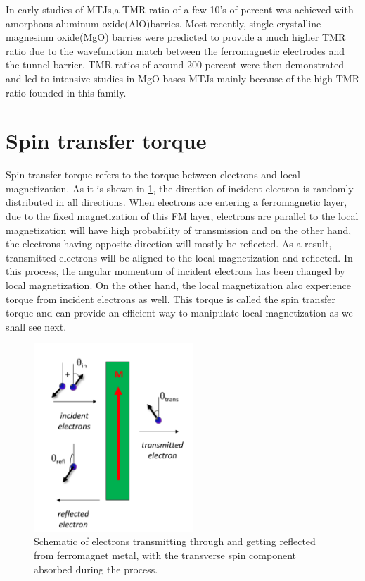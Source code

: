 In early studies of MTJs,a TMR ratio of a few 10's of percent was achieved with amorphous aluminum oxide(AlO)barries. Most recently, single crystalline magnesium oxide(MgO) barries were predicted to provide a much higher TMR ratio due to the wavefunction match between the ferromagnetic electrodes and the tunnel barrier. TMR ratios of around 200 percent were then demonstrated and led to intensive studies in MgO bases MTJs mainly because of the high TMR ratio founded in this family\cite{Mg0}.


\section{Spin transfer torque}

Spin transfer torque refers to the torque between electrons and local magnetization. As it is shown in \ref{fig:electron}, the direction of incident electron is randomly distributed in all directions. When electrons are entering a ferromagnetic layer, due to the fixed magnetization of this FM layer, electrons are parallel to the local magnetization will have high probability of transmission and on the other hand, the electrons having opposite direction will mostly be reflected. As a result, transmitted electrons will be aligned to the local magnetization and reflected. In this process, the angular momentum of incident electrons has been changed by local magnetization. On the other hand, the local magnetization also experience torque from incident electrons as well. This torque is called the spin transfer torque\cite{STT} \cite{Currenttorque} and can provide an efficient way to manipulate local magnetization as we shall see next.

\begin{figure}[ht]

  \includegraphics[width=60mm]{fig/electron.png}
  \centering
  \caption{Schematic of electrons transmitting through and getting reflected from ferromagnet metal, with the transverse spin component absorbed during the process.  }
  \label{fig:electron}
\end{figure}

